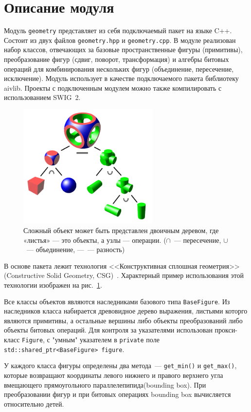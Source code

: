 \section{Описание модуля}
Модуль \verb"geometry" представляет из себя подключаемый пакет на языке {\sf C++}. Состоит из двух файлов \verb"geometry.hpp" и \verb"geometry.cpp". В модуле реализован набор классов, отвечающих за базовые пространственные фигуры (примитивы), преобразование фигур (сдвиг, поворот, трансформация) и алгебры битовых операций для комбинирования нескольких фигур (объединение, пересечение, исключение). Модуль использует в качестве подключаемого пакета библиотеку {\sf aivlib}. Проекты с подключенным модулем можно также компилировать с использованием {\sf SWIG~2}.

\begin{figure}
    \begin{center}
        \includegraphics[width=7cm]{images/Csg_tree.png}
    \end{center}
    \caption{Сложный объект может быть представлен двоичным деревом, где «листья» — это объекты, а узлы — операции. ($\cap$~--- пересечение, $\cup$~--- объединение, ---~--- разность)}
    \label{img:csg}
\end{figure}
В основе пакета лежит технология <<Конструктивная сплошная геометрия>> (Constructive Solid Geometry, CSG)~\cite{csg}. Характерный пример использования этой технологии изображен на рис.~\ref{img:csg}.


Все классы объектов являются наследниками базового типа \verb"BaseFigure". Из наследников класса набирается древовидное дерево выражения, листьями которго являются примитивы, а остальные вершины либо объекты преобразований либо объекты битовых операций. Для контроля за указателями использован прокси-класс \verb"Figure", с "умным" указателем в \verb"private" поле \verb"std::shared_ptr<BaseFigure> figure". 

У каждого класса фигуры определены два метода~--- \verb"get_min()" и \verb"get_max()", которые возвращают координаты левого нижнего и правого верхнего угла вмещающего прямоугольного параллелепипида(bounding box). При преобразовании фигур и при битовых операциях bounding box вычисляется относительно детей.

